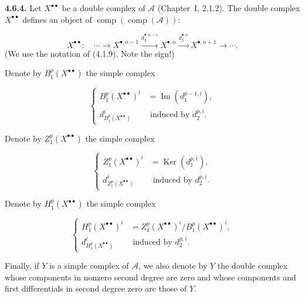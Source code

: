 \clearpage
{}%
\begingroup\small\setlength{\parskip}{0pt}\setlength{\emergencystretch}{1.5em}
\setlength{\abovedisplayskip}{4pt plus 2pt minus 2pt}%
\setlength{\belowdisplayskip}{4pt plus 2pt minus 2pt}%

\noindent\textbf{4.6.4.}\quad
Let $X^{\bullet\bullet}$ be a double complex of $\mathcal A$
(Chapter~I, 2.1.2). The double complex $X^{\bullet\bullet}$ defines an
object of $\operatorname{comp}(\operatorname{comp}(\mathcal A))$:

\[
X^{\bullet\bullet}\colon\quad
\cdots\longrightarrow X^{\bullet,n-1}
\xrightarrow{d_2^{\bullet,n-1}}X^{\bullet,n}
\xrightarrow{d_2^{\bullet,n}}X^{\bullet,n+1}
\longrightarrow\cdots.
\]
(We use the notation of (4.1.9). Note the sign!)

Denote by $B_1^p(X^{\bullet\bullet})$ the simple complex

\[
\left\{
\begin{aligned}
B_1^p(X^{\bullet\bullet})^i
  &=\operatorname{Im}(d_1^{p-1,i}),\\
d_{B_1^p(X^{\bullet\bullet})}^{i}
  &\text{ induced by }d_2^{p,i}.
\end{aligned}
\right.
\tag{4.6.4.1}
\]

Denote by $Z_1^p(X^{\bullet\bullet})$ the simple complex

\[
\left\{
\begin{aligned}
Z_1^p(X^{\bullet\bullet})^i
  &=\operatorname{Ker}(d_1^{p,i}),\\
d_{Z_1^p(X^{\bullet\bullet})}^{i}
  &\text{ induced by }d_2^{p,i}.
\end{aligned}
\right.
\tag{4.6.4.2}
\]

Denote by $H_1^p(X^{\bullet\bullet})$ the simple complex

\[
\left\{
\begin{aligned}
H_1^p(X^{\bullet\bullet})^i
  &=Z_1^p(X^{\bullet\bullet})^i/B_1^p(X^{\bullet\bullet})^i,\\
d_{H_1^p(X^{\bullet\bullet})}^{i}
  &\text{ induced by }d_2^{p,i}.
\end{aligned}
\right.
\tag{4.6.4.3}
\]

Finally, if $Y$ is a simple complex of $\mathcal A$, we also denote by
$Y$ the double complex whose components in nonzero second degree are zero
and whose components and first differentials in second degree zero are
those of $Y$.

